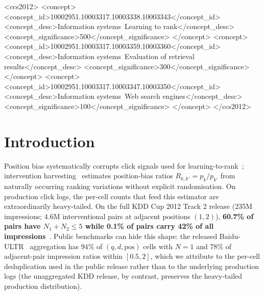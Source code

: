 \documentclass[sigconf]{acmart}
\begin{document}
\begin{CCSXML}
<ccs2012>
   <concept>
       <concept_id>10002951.10003317.10003338.10003343</concept_id>
       <concept_desc>Information systems~Learning to rank</concept_desc>
       <concept_significance>500</concept_significance>
       </concept>
   <concept>
       <concept_id>10002951.10003317.10003359.10003360</concept_id>
       <concept_desc>Information systems~Evaluation of retrieval results</concept_desc>
       <concept_significance>300</concept_significance>
       </concept>
   <concept>
       <concept_id>10002951.10003317.10003347.10003350</concept_id>
       <concept_desc>Information systems~Web search engines</concept_desc>
       <concept_significance>100</concept_significance>
       </concept>
 </ccs2012>
\end{CCSXML}



\maketitle

\section{Introduction}
\label{sec:intro}

Position bias systematically corrupts click signals used for
learning-to-rank~\cite{joachims2017unbiased}; intervention
harvesting~\cite{agarwal2019estimating} estimates position-bias ratios
$R_{k,k'}=p_k/p_{k'}$ from naturally occurring ranking variations without
explicit randomisation. On production click logs, the per-cell counts that
feed this estimator are extraordinarily heavy-tailed. On the full
KDD Cup 2012 Track 2 release (235M impressions; 4.6M interventional pairs
at adjacent positions $(1,2)$), \textbf{60.7\% of pairs have
$N_1+N_2\le 5$ while 0.1\% of pairs carry 42\% of all
impressions}~\cite{kddcup2012}. Public benchmarks can hide this shape: the released
Baidu-ULTR~\cite{zou2022large} aggregation has $94\%$ of $(q,d,\mathrm{pos})$
cells with $N=1$ and $78\%$ of adjacent-pair impression ratios within
$[0.5,2]$, which we attribute to the per-cell deduplication used in the
public release rather than to the underlying production logs (the
unaggregated KDD release, by contrast, preserves the heavy-tailed
production distribution).
\end{document}
